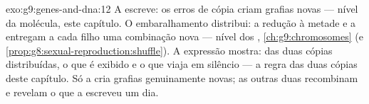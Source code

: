\begin{solution}{exo:g9:genes-and-dna:12}
A  escreve: os erros de cópia criam grafias novas ---
nível da molécula, este capítulo. O embaralhamento
distribui: a redução à metade e a  entregam a cada
filho uma combinação nova --- nível dos ,
\cref{ch:g9:chromosomes} (e
\cref{prop:g8:sexual-reproduction:shuffle}). A expressão
mostra: das duas cópias distribuídas, o que é exibido e o que
viaja em silêncio --- a regra das duas cópias deste capítulo.
Só a  cria grafias genuinamente novas; as outras duas
recombinam e revelam o que a  escreveu um dia.
\end{solution}

